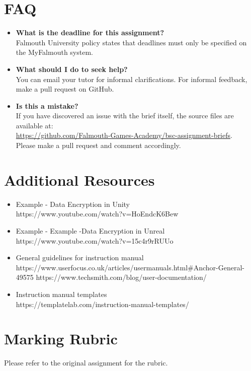 \documentclass{../../fal_assignment}
\begin{document}
\section*{FAQ}

\begin{itemize}
	\item 	\textbf{What is the deadline for this assignment?} \\ 
    		Falmouth University policy states that deadlines must only be specified on the MyFalmouth system.
    		
	\item 	\textbf{What should I do to seek help?} \\ 
    		You can email your tutor for informal clarifications. For informal feedback, make a pull request on GitHub. 
    		
    	\item 	\textbf{Is this a mistake?} \\ 	
    		If you have discovered an issue with the brief itself, the source files are available at: \\
    		\url{https://github.com/Falmouth-Games-Academy/bsc-assignment-briefs}.\\
    		 Please make a pull request and comment accordingly.
\end{itemize}

\section*{Additional Resources}

\begin{itemize}
    \item Example - Data Encryption in Unity\\ https://www.youtube.com/watch?v=HoEndcK6Bew
    \item Example - Example -Data Encryption in Unreal\\ https://www.youtube.com/watch?v=15c4r9rRUUo
    \item General guidelines for instruction manual\\ https://www.userfocus.co.uk/articles/usermanuals.html\#Anchor-General-49575 https://www.techsmith.com/blog/user-documentation/
    \item Instruction manual templates\\ https://templatelab.com/instruction-manual-templates/
\end{itemize}

\section*{Marking Rubric}
Please refer to the original assignment for the rubric.
\end{document}
